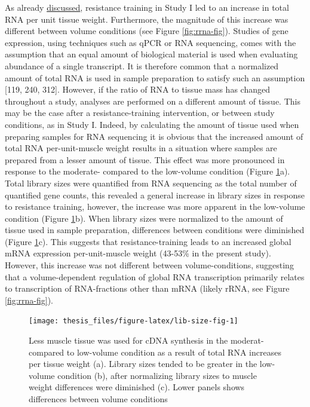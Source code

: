 \documentclass[twoside,10pt]{gihclass} %
\begin{document}
As already \protect\hyperlink{muscle-mass-growth}{discussed}, resistance training in Study I led to an increase in total RNA per unit tissue weight. Furthermore, the magnitude of this increase was different between volume conditions (see Figure \ref{fig:rrna-fig}).
Studies of gene expression, using techniques such as qPCR or RNA sequencing, comes with the assumption that an equal amount of biological material is used when evaluating abundance of a single transcript.
It is therefore common that a normalized amount of total RNA is used in sample preparation to satisfy such an assumption
{[}119, 240, 312{]}.
However, if the ratio of RNA to tissue mass has changed throughout a study, analyses are performed on a different amount of tissue. This may be the case after a resistance-training intervention, or between study conditions, as in Study I.
Indeed, by calculating the amount of tissue used when preparing samples for RNA sequencing it is obvious that the increased amount of total RNA per-unit-muscle weight results in a situation where samples are prepared from a lesser amount of tissue.
This effect was more pronounced in response to the moderate- compared to the low-volume condition (Figure \ref{fig:lib-size-fig}a).
Total library sizes were quantified from RNA sequencing as the total number of quantified gene counts, this revealed a general increase in library sizes in response to resistance training, however, the increase was more apparent in the low-volume condition
(Figure \ref{fig:lib-size-fig}b).
When library sizes were normalized to the amount of tissue used in sample preparation, differences between conditions were diminished
(Figure \ref{fig:lib-size-fig}c).
This suggests that resistance-training leads to an increased global mRNA expression per-unit-muscle weight (43-53\% in the present study). However, this increase was not different between volume-conditions, suggesting that a volume-dependent regulation of global RNA transcription primarily relates to transcription of RNA-fractions other than mRNA (likely rRNA, see Figure \ref{fig:rrna-fig}).
\begin{figure}

{\centering \texttt{[image: thesis\_files/figure-latex/lib-size-fig-1]} 

}

\caption[Muscle weight and RNA-seq library size]{Less muscle tissue was used for cDNA synthesis in the moderat- compared to low-volume condition as a result of total RNA increases per tissue weight (a). Library sizes tended to be greater in the low-volume condition (b), after normalizing library sizes to muscle weight differences were diminished (c). Lower panels shows differences between volume conditions}\label{fig:lib-size-fig}
\end{figure}
\end{document}

